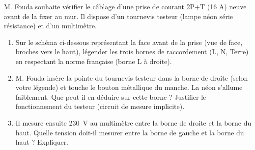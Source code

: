 \documentclass[11pt]{article}
\begin{document}
\begin{exercice}
M. Fouda souhaite vérifier le câblage d'une prise de courant 2P+T (16 A) neuve avant de la fixer au mur. Il dispose d'un tournevis testeur (lampe néon série résistance) et d'un multimètre.

\begin{enumerate}
    \item Sur le schéma ci-dessous représentant la face avant de la prise (vue de face, broches vers le haut), légender les trois bornes de raccordement (L, N, Terre) en respectant la norme française (borne L à droite).
    \begin{center}
    \end{center}
    \item M. Fouda insère la pointe du tournevis testeur dans la borne de droite (selon votre légende) et touche le bouton métallique du manche. La néon s'allume faiblement. Que peut-il en déduire sur cette borne ? Justifier le fonctionnement du testeur (circuit de mesure implicite).
    \item Il mesure ensuite \SI{230}{\volt} au multimètre entre la borne de droite et la borne du haut. Quelle tension doit-il mesurer entre la borne de gauche et la borne du haut ? Expliquer.
\end{enumerate}
\end{exercice}
\end{document}
